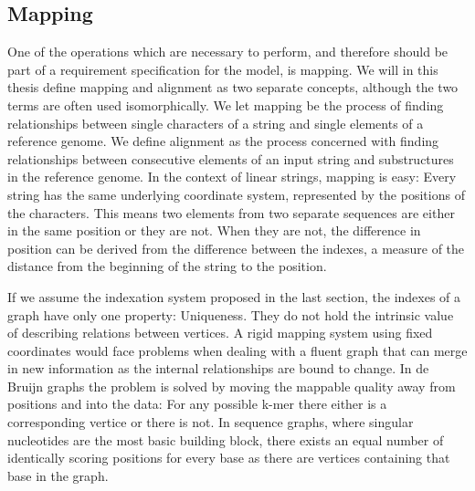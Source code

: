 \documentclass[thesis.tex]{subfiles}
\begin{document}
\subsection{Mapping}
\label{sec:mapping}
One of the operations which are necessary to perform, and therefore should be part of a requirement specification for the model, is mapping. We will in this thesis define mapping and alignment as two separate concepts, although the two terms are often used isomorphically. We let mapping be the process of finding relationships between single characters of a string and single elements of a reference genome. We define alignment as the process concerned with finding relationships between consecutive elements of an input string and substructures in the reference genome. In the context of linear strings, mapping is easy: Every string has the same underlying coordinate system, represented by the positions of the characters. This means two elements from two separate sequences are either in the same position or they are not. When they are not, the difference in position can be derived from the difference between the indexes, a measure of the distance from the beginning of the string to the position.\\
\par\noindent
If we assume the indexation system proposed in the last section, the indexes of a graph have only one property: Uniqueness. They do not hold the intrinsic value of describing relations between vertices. A rigid mapping system using fixed coordinates would face problems when dealing with a fluent graph that can merge in new information as the internal relationships are bound to change. In de Bruijn graphs the problem is solved by moving the mappable quality away from positions and into the data: For any possible k-mer there either is a corresponding vertice or there is not. In sequence graphs, where singular nucleotides are the most basic building block, there exists an equal number of identically scoring positions for every base as there are vertices containing that base in the graph.\\
\par\noindent
\end{document}
